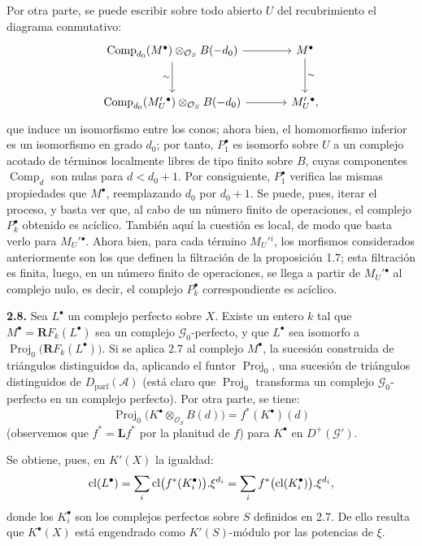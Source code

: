 Por otra parte, se puede escribir sobre todo abierto $U$ del recubrimiento el diagrama conmutativo:
\[
\begin{tikzcd}[column sep=large,row sep=large]
\operatorname{Comp}_{d_0}(M^{\bullet})\otimes_{\mathcal O_S}B(-d_0) \arrow[r] \arrow[d,"\sim"'] & M^{\bullet} \arrow[d,"\sim"]\\
\operatorname{Comp}_{d_0}(M_U'{}^{\bullet})\otimes_{\mathcal O_S}B(-d_0) \arrow[r] & M_U'{}^{\bullet},
\end{tikzcd}
\]
que induce un isomorfismo entre los conos; ahora bien, el homomorfismo inferior es un isomorfismo en grado $d_0$; por tanto, $P_1^{\bullet}$ es isomorfo sobre $U$ a un complejo acotado de términos localmente libres de tipo finito sobre $B$, cuyas componentes $\operatorname{Comp}_d$ son nulas para $d<d_0+1$. Por consiguiente, $P_1^{\bullet}$ verifica las mismas propiedades que $M^{\bullet}$, reemplazando $d_0$ por $d_0+1$. Se puede, pues, iterar el proceso, y basta ver que, al cabo de un número finito de operaciones, el complejo $P_k^{\bullet}$ obtenido es acíclico. También aquí la cuestión es local, de modo que basta verlo para $M_U'{}^{\bullet}$. Ahora bien, para cada término $M_U'{}^i$, los morfismos considerados anteriormente son los que definen la filtración de la proposición 1.7; esta filtración es finita, luego, en un número finito de operaciones, se llega a partir de $M_U'{}^{\bullet}$ al complejo nulo, es decir, el complejo $P_k^{\bullet}$ correspondiente es acíclico.

\textbf{2.8.} Sea $L^{\bullet}$ un complejo perfecto sobre $X$. Existe un entero $k$ tal que $M^{\bullet}=\mathbf R F_k(L^{\bullet})$ sea un complejo $\mathcal G_0$-perfecto, y que $L^{\bullet}$ sea isomorfo a $\operatorname{Proj}_0\bigl(\mathbf R F_k(L^{\bullet})\bigr)$. Si se aplica 2.7 al complejo $M^{\bullet}$, la sucesión construida de triángulos distinguidos da, aplicando el funtor $\operatorname{Proj}_0$, una sucesión de triángulos distinguidos de $D_{\mathrm{parf}}(\mathcal A)$ (está claro que $\operatorname{Proj}_0$ transforma un complejo $\mathcal G_0$-perfecto en un complejo perfecto). Por otra parte, se tiene:
\[
  \operatorname{Proj}_0\bigl(K^{\bullet}\otimes_{\mathcal O_S}B(d)\bigr)
  = f^*(K^{\bullet})(d)
\]
(observemos que $f^*=\mathbf L f^*$ por la planitud de $f$) para $K^{\bullet}$ en $D^+(\mathcal G')$.

Se obtiene, pues, en $K'(X)$ la igualdad:
\[
  \operatorname{cl}(L^{\bullet})
  =\sum_i\operatorname{cl}\bigl(f^*(K_i^{\bullet})\bigr).\xi^{d_i}
  =\sum_i f^*\bigl(\operatorname{cl}(K_i^{\bullet})\bigr).\xi^{d_i},
\]
donde los $K_i^{\bullet}$ son los complejos perfectos sobre $S$ definidos en 2.7. De ello resulta que $K^\bullet(X)$ está engendrado como $K'(S)$-módulo por las potencias de $\xi$.

